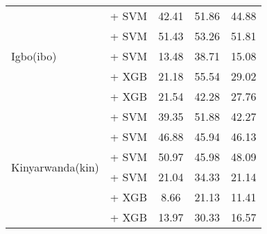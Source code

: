 \begin{longtable}{llccc}
    \midrule
    \multirow{5}{*}{Igbo(ibo)}            & \citep{feng2022languageagnosticbertsentenceembedding} + SVM        & 42.41                                & 51.86              & 44.88             \\
                                          & \citep{wang2024multilingual} + SVM                                 & 51.43                                & 53.26              & 51.81             \\
                                          & \citep{oketunji2024pmmlv2finetunedigbo} + SVM                      & 13.48                                & 38.71              & 15.08             \\
                                          & \citep{all-MiniLM-L12-v2} + XGB                                    & 21.18                                & 55.54              & 29.02             \\
                                          & \citep{sturua2024jinaembeddingsv3multilingualembeddingstask} + XGB & 21.54                                & 42.28              & 27.76             \\

    \midrule
    \multirow{6}{*}{Kinyarwanda(kin)}     & \citep{feng2022languageagnosticbertsentenceembedding} + SVM        & 39.35                                & 51.88              & 42.27             \\
                                          & \citep{adelani2023bertmultilingualkinyarwanda} + SVM               & 46.88                                & 45.94              & 46.13             \\
                                          & \citep{wang2024multilingual} + SVM                                 & 50.97                                & 45.98              & 48.09             \\
                                          & \citep{adelani2023xlmrobertakinyrwanda} + SVM                      & 21.04                                & 34.33              & 21.14             \\
                                          & \citep{all-MiniLM-L12-v2} + XGB                                    & 8.66                                 & 21.13              & 11.41             \\
                                          & \citep{sturua2024jinaembeddingsv3multilingualembeddingstask} + XGB & 13.97                                & 30.33              & 16.57             \\


\end{longtable}
